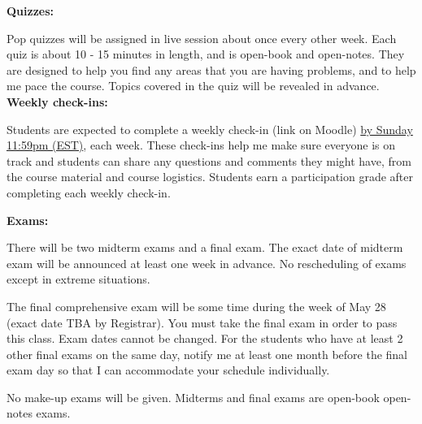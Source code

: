 \documentclass[11pt]{article}
\newcommand{\pl}[1]{\textcolor{Regalia}{\textbf{#1}}}
\begin{document}
\pl{Quizzes:}	

Pop quizzes will be assigned in live session about once every other week.
Each quiz is about 10 - 15 minutes in length, and is open-book and open-notes.
They are designed to help you find any areas that you are having problems, and to help me pace the course. Topics covered in the quiz will  be revealed in advance.\\

%

\pl{Weekly check-ins:}

Students are expected to complete a weekly check-in (link on Moodle) {\underline{by Sunday 11:59pm (EST)}}, each week. These check-ins help me make sure everyone is on track and students can share any questions and comments they might have, from the course material and course logistics. Students earn a participation grade after completing each weekly check-in.


\pl{Exams:}	

There will be two midterm exams and a final exam. The exact date of midterm exam will be announced at least one week in advance. No rescheduling of exams except in extreme situations.

The final comprehensive exam will be some time during the week of May 28 (exact date TBA by Registrar). You must take the final exam in order to pass this class. Exam dates cannot be changed.
For the students who have at least 2 other final exams on the same day, notify me at least one month before the final exam day so that I can accommodate your schedule individually.


No make-up exams will be given. Midterms and final exams are open-book open-notes exams. %
\\
\end{document}
